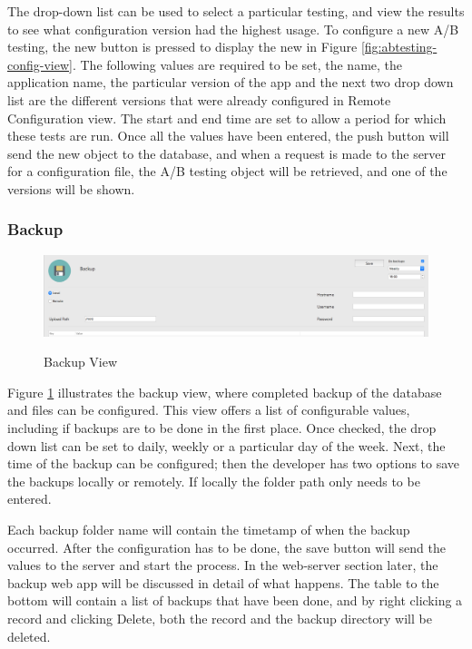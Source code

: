 The drop-down list can be used to select a particular testing, and view the results to see what configuration version had the highest usage. To configure a new A/B testing, the new button is pressed to display the new in Figure \ref{fig:abtesting-config-view}. The following values are required to be set, the name, the application name, the particular version of the app and the next two drop down list are the different versions that were already configured in Remote Configuration view. The start and end time are set to allow a period for which these tests are run. Once all the values have been entered, the push button will send the new object to the database, and when a request is made to the server for a configuration file, the A/B testing object will be retrieved, and one of the versions will be shown.

\subsubsection{Backup}

\begin{figure}[!h]
    \caption{Backup View}
    \centering
    \includegraphics[width=150mm]{images/dashboard/backup}
    \label{fig:backup-view}
\end{figure} 

Figure \ref{fig:backup-view} illustrates the backup view, where completed backup of the database and files can be configured. This view offers a list of configurable values, including if backups are to be done in the first place. Once checked, the drop down list can be set to daily, weekly or a particular day of the week. Next, the time of the backup can be configured; then the developer has two options to save the backups locally or remotely. If locally the folder path only needs to be entered.

Each backup folder name will contain the timetamp of when the backup occurred. After the configuration has to be done, the save button will send the values to the server and start the process. In the web-server section later, the backup web app will be discussed in detail of what happens. The table to the bottom will contain a list of backups that have been done, and by right clicking a record and clicking Delete, both the record and the backup directory will be deleted.


